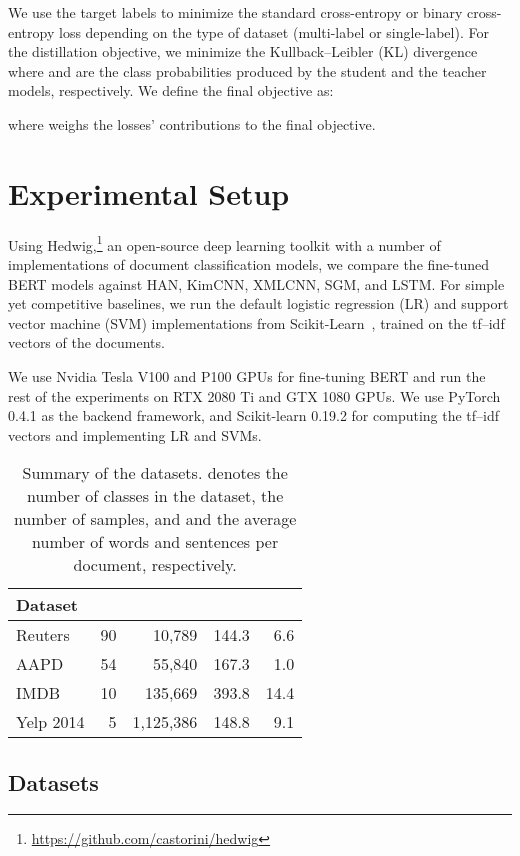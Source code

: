 \documentclass[11pt,a4paper]{article}
\newcommand{\BLSTMR}[1]{LSTM}
\begin{document}
We use the target labels to minimize the standard cross-entropy or binary cross-entropy loss depending on the type of dataset (multi-label or single-label).
For the distillation objective, we minimize the Kullback--Leibler (KL) divergence  where  and  are the class probabilities produced by the student and the teacher models, respectively. We define the final objective as:

where   weighs the losses' contributions to the final objective.

\section{Experimental Setup}

\renewcommand*{\thefootnote}{\arabic{footnote}}

Using Hedwig,\footnote{\url{https://github.com/castorini/hedwig}} an open-source deep learning toolkit with a number of implementations of document classification models, we compare the fine-tuned BERT models against HAN, KimCNN, XMLCNN, SGM, and \BLSTMR{}.
For simple yet competitive baselines, we run the default logistic regression (LR) and support vector machine (SVM) implementations from Scikit-Learn~\cite{scikit-learn}, trained on the tf--idf vectors of the documents.

We use Nvidia Tesla V100 and P100 GPUs for fine-tuning BERT and run the rest of the experiments on RTX 2080 Ti and GTX 1080 GPUs.
We use PyTorch 0.4.1 as the backend framework, and Scikit-learn 0.19.2 for computing the tf--idf vectors and implementing LR and SVMs.

\begin{table}
\centering
\begin{tabular}{lrrrr}
\toprule[1pt]
Dataset &  &  &  &  \\
\midrule
Reuters & 90 & 10,789 & 144.3 & 6.6 \\
AAPD & 54 & 55,840 & 167.3 & 1.0 \\
IMDB & 10 & 135,669 & 393.8 & 14.4 \\
Yelp 2014 & 5 & 1,125,386 & 148.8 & 9.1 \\ \bottomrule[1pt]
\end{tabular}
\caption{Summary of the datasets.  denotes the number of classes in the dataset,  the number of samples, and  and  the average number of words and sentences per document, respectively.}
\label{table:datasets}
\end{table}

\subsection{Datasets} \label{sec:datasets}
\end{document}
